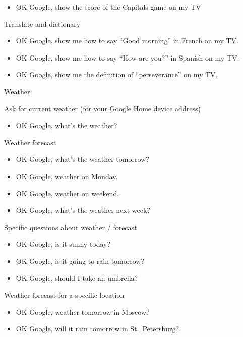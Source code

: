 \documentclass[
  letterpaper,
  DIV=11,
  numbers=noendperiod]{scrartcl}
\providecommand{\tightlist}{%
  \setlength{\itemsep}{0pt}\setlength{\parskip}{0pt}}\usepackage{longtable,booktabs,array}
\begin{document}
\begin{itemize}
\tightlist
\item
  OK Google, show the score of the Capitals game on my TV
\end{itemize}

Translate and dictionary

\begin{itemize}
\item
  OK Google, show me how to say ``Good morning'' in French on my TV.
\item
  OK Google, show me how to say ``How are you?'' in Spanish on my TV.
\item
  OK Google, show me the definition of ``perseverance'' on my TV.
\end{itemize}

Weather

Ask for current weather (for your Google Home device address)

\begin{itemize}
\tightlist
\item
  OK Google, what's the weather?
\end{itemize}

Weather forecast

\begin{itemize}
\item
  OK Google, what's the weather tomorrow?
\item
  OK Google, weather on Monday.
\item
  OK Google, weather on weekend.
\item
  OK Google, what's the weather next week?
\end{itemize}

Specific questions about weather / forecast

\begin{itemize}
\item
  OK Google, is it sunny today?
\item
  OK Google, is it going to rain tomorrow?
\item
  OK Google, should I take an umbrella?
\end{itemize}

Weather forecast for a specific location

\begin{itemize}
\item
  OK Google, weather tomorrow in Moscow?
\item
  OK Google, will it rain tomorrow in St.~Petersburg?
\end{itemize}


\printbibliography
\end{document}
